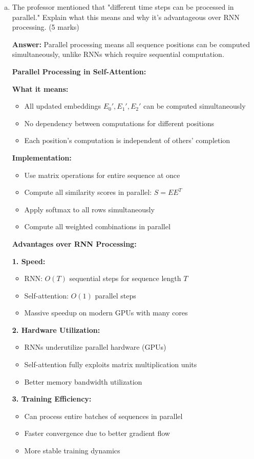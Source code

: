 \documentclass[12pt]{article}
\newcommand{\answer}[1]{{\color{answercolor}\textbf{Answer:} #1}}
\newcommand{\explanation}[1]{{\color{explanationcolor}#1}}
\begin{document}
\begin{enumerate}[(a)]
    \item The professor mentioned that "different time steps can be processed in parallel." Explain what this means and why it's advantageous over RNN processing. \hfill (5 marks)
    
    \answer{Parallel processing means all sequence positions can be computed simultaneously, unlike RNNs which require sequential computation.}
    
    \explanation{
    \textbf{Parallel Processing in Self-Attention:}
    
    \textbf{What it means:}
    \begin{itemize}
        \item All updated embeddings $E_0', E_1', E_2'$ can be computed simultaneously
        \item No dependency between computations for different positions
        \item Each position's computation is independent of others' completion
    \end{itemize}
    
    \textbf{Implementation:}
    \begin{itemize}
        \item Use matrix operations for entire sequence at once
        \item Compute all similarity scores in parallel: $S = EE^T$
        \item Apply softmax to all rows simultaneously
        \item Compute all weighted combinations in parallel
    \end{itemize}
    
    \textbf{Advantages over RNN Processing:}
    
    \textbf{1. Speed:}
    \begin{itemize}
        \item RNN: $O(T)$ sequential steps for sequence length $T$
        \item Self-attention: $O(1)$ parallel steps
        \item Massive speedup on modern GPUs with many cores
    \end{itemize}
    
    \textbf{2. Hardware Utilization:}
    \begin{itemize}
        \item RNNs underutilize parallel hardware (GPUs)
        \item Self-attention fully exploits matrix multiplication units
        \item Better memory bandwidth utilization
    \end{itemize}
    
    \textbf{3. Training Efficiency:}
    \begin{itemize}
        \item Can process entire batches of sequences in parallel
        \item Faster convergence due to better gradient flow
        \item More stable training dynamics
    \end{itemize}
    }
\end{enumerate}
\end{document}
